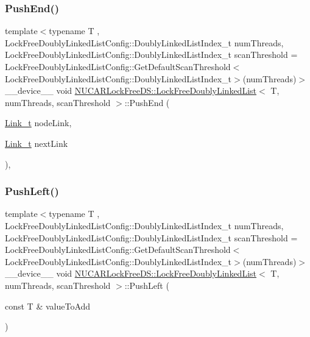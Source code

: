 \subsubsection{\texorpdfstring{Push\+End()}{PushEnd()}}
{\footnotesize\ttfamily template$<$typename T , Lock\+Free\+Doubly\+Linked\+List\+Config\+::\+Doubly\+Linked\+List\+Index\+\_\+t num\+Threads, Lock\+Free\+Doubly\+Linked\+List\+Config\+::\+Doubly\+Linked\+List\+Index\+\_\+t scan\+Threshold = Lock\+Free\+Doubly\+Linked\+List\+Config\+::\+Get\+Default\+Scan\+Threshold$<$\+Lock\+Free\+Doubly\+Linked\+List\+Config\+::\+Doubly\+Linked\+List\+Index\+\_\+t$>$(num\+Threads)$>$ \\
\+\_\+\+\_\+device\+\_\+\+\_\+ void \mbox{\hyperlink{class_n_u_c_a_r_lock_free_d_s_1_1_lock_free_doubly_linked_list}{N\+U\+C\+A\+R\+Lock\+Free\+D\+S\+::\+Lock\+Free\+Doubly\+Linked\+List}}$<$ T, num\+Threads, scan\+Threshold $>$\+::Push\+End (\begin{DoxyParamCaption}\item[{\mbox{\hyperlink{class_n_u_c_a_r_lock_free_d_s_1_1_lock_free_doubly_linked_list_a08f21d5e04bc2a02d6c1d8861a6ba0de}{Link\+\_\+t}}}]{node\+Link,  }\item[{\mbox{\hyperlink{class_n_u_c_a_r_lock_free_d_s_1_1_lock_free_doubly_linked_list_a08f21d5e04bc2a02d6c1d8861a6ba0de}{Link\+\_\+t}}}]{next\+Link }\end{DoxyParamCaption})\hspace{0.3cm}{\ttfamily [inline]}, {\ttfamily [private]}}

\mbox{\label{class_n_u_c_a_r_lock_free_d_s_1_1_lock_free_doubly_linked_list_aa07c30942cfd1d8cc4eca96ce135ad31}} 
\subsubsection{\texorpdfstring{Push\+Left()}{PushLeft()}}
{\footnotesize\ttfamily template$<$typename T , Lock\+Free\+Doubly\+Linked\+List\+Config\+::\+Doubly\+Linked\+List\+Index\+\_\+t num\+Threads, Lock\+Free\+Doubly\+Linked\+List\+Config\+::\+Doubly\+Linked\+List\+Index\+\_\+t scan\+Threshold = Lock\+Free\+Doubly\+Linked\+List\+Config\+::\+Get\+Default\+Scan\+Threshold$<$\+Lock\+Free\+Doubly\+Linked\+List\+Config\+::\+Doubly\+Linked\+List\+Index\+\_\+t$>$(num\+Threads)$>$ \\
\+\_\+\+\_\+device\+\_\+\+\_\+ void \mbox{\hyperlink{class_n_u_c_a_r_lock_free_d_s_1_1_lock_free_doubly_linked_list}{N\+U\+C\+A\+R\+Lock\+Free\+D\+S\+::\+Lock\+Free\+Doubly\+Linked\+List}}$<$ T, num\+Threads, scan\+Threshold $>$\+::Push\+Left (\begin{DoxyParamCaption}\item[{const T \&}]{value\+To\+Add }\end{DoxyParamCaption})\hspace{0.3cm}{\ttfamily [inline]}}

